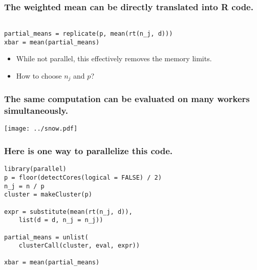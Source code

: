 \documentclass{beamer}
\begin{document}
\begin{frame}[fragile]

    \frametitle{The weighted mean can be directly translated into R code.}


\begin{verbatim}

partial_means = replicate(p, mean(rt(n_j, d)))
xbar = mean(partial_means)

\end{verbatim}

\pause 

    \begin{itemize}
        \item While not parallel, this effectively removes the memory limits.
        \item How to choose $n_j$ and $p$?
    \end{itemize}

\end{frame}
\begin{frame}

    \frametitle{The same computation can be evaluated on many workers
    simultaneously.}


\centerline{\texttt{[image: ../snow.pdf]}}

\end{frame}
\begin{frame}[fragile]

    \frametitle{Here is one way to parallelize this code.}


\begin{verbatim}
library(parallel)
p = floor(detectCores(logical = FALSE) / 2)
n_j = n / p
cluster = makeCluster(p)

expr = substitute(mean(rt(n_j, d)),
    list(d = d, n_j = n_j))

partial_means = unlist(
    clusterCall(cluster, eval, expr))

xbar = mean(partial_means)
\end{verbatim}

\end{frame}
\end{document}
